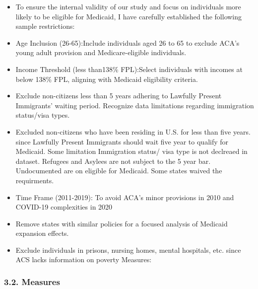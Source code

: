 \documentclass[
]{article}
\begin{document}
\begin{itemize}
\item
  To ensure the internal validity of our study and focus on individuals
  more likely to be eligible for Medicaid, I have carefully established
  the following sample restrictions:
\item
  Age Inclusion (26-65):Include individuals aged 26 to 65 to exclude
  ACA's young adult provision and Medicare-eligible individuals.
\item
  Income Threshold (less than138\% FPL):Select individuals with incomes
  at below 138\% FPL, aligning with Medicaid eligibility criteria.
\item
  Exclude non-citizens less than 5 years adhering to Lawfully Present
  Immigrants' waiting period. Recognize data limitations regarding
  immigration status/visa types.
\item
  Excluded non-citizens who have been residing in U.S. for less than
  five years. since Lawfully Present Immigrants should wait five year to
  qualify for Medicaid. Some limitation Immigration status/ visa type is
  not declreaed in dataset. Refugees and Asylees are not subject to the
  5 year bar. Undocumented are on eligible for Medicaid. Some states
  waived the requirments.
\item
  Time Frame (2011-2019): To avoid ACA's minor provisions in 2010 and
  COVID-19 complexities in 2020
\item
  Remove states with similar policies for a focused analysis of Medicaid
  expansion effects.
\item
  Exclude individuals in prisons, nursing homes, mental hospitals, etc.
  since ACS lacks information on poverty Measures:
\end{itemize}

\hypertarget{measures}{%
\subsubsection{3.2. Measures}\label{measures}}
\end{document}
